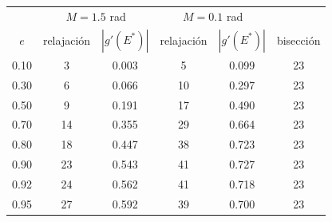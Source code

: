 \begin{tabular}{c cc cc c}
\toprule
 & \multicolumn{2}{c}{$M=1.5$ rad} & \multicolumn{2}{c}{$M=0.1$ rad} & \\
$e$ & relajación & $|g'(E^*)|$ & relajación & $|g'(E^*)|$ & bisección\\
\midrule
0.10 & 3 & 0.003 & 5 & 0.099 & 23\\
0.30 & 6 & 0.066 & 10 & 0.297 & 23\\
0.50 & 9 & 0.191 & 17 & 0.490 & 23\\
0.70 & 14 & 0.355 & 29 & 0.664 & 23\\
0.80 & 18 & 0.447 & 38 & 0.723 & 23\\
0.90 & 23 & 0.543 & 41 & 0.727 & 23\\
0.92 & 24 & 0.562 & 41 & 0.718 & 23\\
0.95 & 27 & 0.592 & 39 & 0.700 & 23\\
\bottomrule
\end{tabular}
